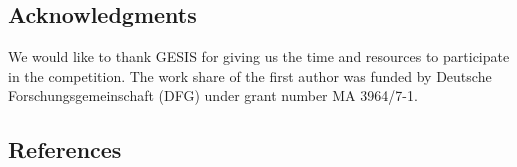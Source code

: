 \subsection{Acknowledgments} 
We would like to thank GESIS for giving us the time and resources to participate in the competition.
The work share of the first author was funded by Deutsche Forschungsgemeinschaft (DFG) under grant number MA 3964/7-1. \\
\subsection{References} 


